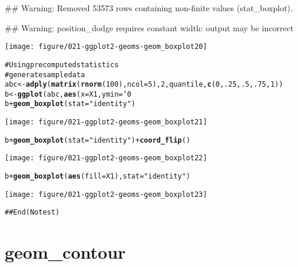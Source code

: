 \documentclass[a4paper,titlepage]{tufte-handout}\usepackage{graphicx, color}
\makeatletter
\def\maxwidth{ %
  \ifdim\Gin@nat@width>\linewidth
    \linewidth
  \else
    \Gin@nat@width
  \fi
}
\newcommand{\hlfunctioncall}[1]{\textcolor[rgb]{0.501960784313725,0,0.329411764705882}{\textbf{#1}}}%
\newcommand{\hlstring}[1]{\textcolor[rgb]{0.6,0.6,1}{#1}}%
\newcommand{\hlcomment}[1]{\textcolor[rgb]{0.180392156862745,0.6,0.341176470588235}{#1}}%
\newenvironment{kframe}{%
 \def\at@end@of@kframe{}%
 \ifinner\ifhmode%
  \def\at@end@of@kframe{\end{minipage}}%
  \begin{minipage}{\columnwidth}%
 \fi\fi%
 \def\FrameCommand##1{\hskip\@totalleftmargin \hskip-\fboxsep
 \colorbox{shadecolor}{##1}\hskip-\fboxsep
     \hskip-\linewidth \hskip-\@totalleftmargin \hskip\columnwidth}%
 \MakeFramed {\advance\hsize-\width
   \@totalleftmargin\z@ \linewidth\hsize
   \@setminipage}}%
 {\par\unskip\endMakeFramed%
 \at@end@of@kframe}
\newenvironment{knitrout}{}{} %
\makeatother
\begin{document}
\begin{knitrout}
\begin{kframe}
{\ttfamily\noindent\textcolor{warningcolor}{\#\# Warning: Removed 53573 rows containing non-finite values (stat\_boxplot).}}

{\ttfamily\noindent\textcolor{warningcolor}{\#\# Warning: position\_dodge requires constant width: output may be incorrect}}\end{kframe}
\texttt{[image: figure/021-ggplot2-geoms-geom\_boxplot20]} 
\begin{kframe}\begin{alltt}

\hlcomment{# Using precomputed statistics}
\hlcomment{# generate sample data}
abc <- \hlfunctioncall{adply}(\hlfunctioncall{matrix}(\hlfunctioncall{rnorm}(100), ncol = 5), 2, quantile, \hlfunctioncall{c}(0, .25, .5, .75, 1))
b <- \hlfunctioncall{ggplot}(abc, \hlfunctioncall{aes}(x = X1, ymin = `0%`, lower = `25%`, middle = `50%`, upper = `75%`, ymax = `100%`))
b + \hlfunctioncall{geom_boxplot}(stat = \hlstring{"identity"})
\end{alltt}
\end{kframe}
\texttt{[image: figure/021-ggplot2-geoms-geom\_boxplot21]} 
\begin{kframe}\begin{alltt}
b + \hlfunctioncall{geom_boxplot}(stat = \hlstring{"identity"}) + \hlfunctioncall{coord_flip}()
\end{alltt}
\end{kframe}
\texttt{[image: figure/021-ggplot2-geoms-geom\_boxplot22]} 
\begin{kframe}\begin{alltt}
b + \hlfunctioncall{geom_boxplot}(\hlfunctioncall{aes}(fill = X1), stat = \hlstring{"identity"})
\end{alltt}
\end{kframe}
\texttt{[image: figure/021-ggplot2-geoms-geom\_boxplot23]} 
\begin{kframe}\begin{alltt}
\hlcomment{## End(No test)}


\end{alltt}
\end{kframe}
\end{knitrout}



\section{geom\_contour}
\end{document}
